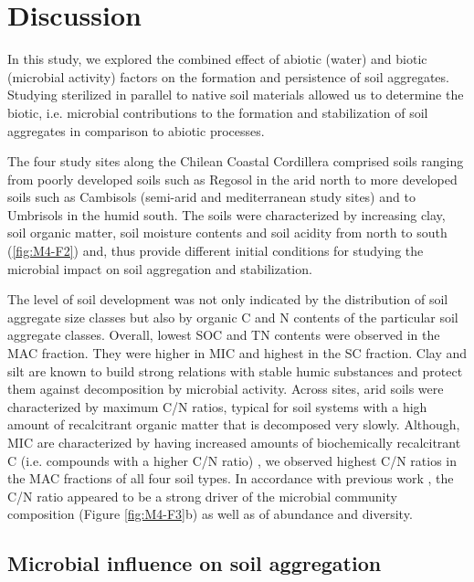 \section{Discussion}

In this study, we explored the combined effect of abiotic (water) and biotic (microbial activity) factors on the formation and persistence of soil aggregates. Studying sterilized in parallel to native soil materials allowed us to determine the biotic, i.e. microbial contributions to the formation and stabilization of soil aggregates in comparison to abiotic processes.

The four study sites along the Chilean Coastal Cordillera comprised soils ranging from poorly developed soils such as Regosol in the arid north to more developed soils such as Cambisols (semi-arid and mediterranean study sites) and to Umbrisols in the humid south. The soils were characterized by increasing clay, soil organic matter, soil moisture contents and soil acidity from north to south \citep{Bernhard2018} (\ref{fig:M4-F2}) and, thus provide different initial conditions for studying the microbial impact on soil aggregation and stabilization.

The level of soil development was not only indicated by the distribution of soil aggregate size classes but also by organic C and N contents of the particular soil aggregate classes. Overall, lowest SOC and TN contents were observed in the MAC fraction. They were higher in MIC and highest in the SC fraction. Clay and silt are known to build strong relations with stable humic substances \citep{Bouajila2021} and protect them against decomposition by microbial activity. Across sites, arid soils were characterized by maximum C/N ratios, typical for soil systems with a high amount of recalcitrant organic matter that is decomposed very slowly. Although, MIC are characterized by having increased amounts of biochemically recalcitrant C (i.e. compounds with a higher C/N ratio) \citep{Elliott1986, Kravchenko2015}, we observed highest C/N ratios in the MAC fractions of all four soil types. In accordance with previous work \citep{Kuramae2012}, the C/N ratio appeared to be a strong driver of the microbial community composition (Figure \ref{fig:M4-F3}b) as well as of abundance and diversity.

\subsection{Microbial influence on soil aggregation}

